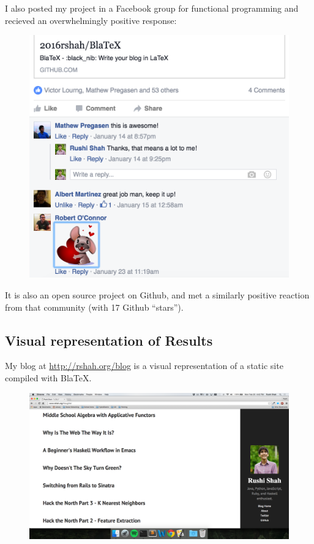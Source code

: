\documentclass[doc,apacite,12pt]{apa6}
\begin{document}
I also posted my project in a Facebook group for functional programming and recieved an overwhelmingly positive response: 
\begin{figure}[ht]
	\includegraphics[width=\textwidth]{facebook}
	\centering
\end{figure}

It is also an open source project on Github, and met a similarly positive reaction from that community (with 17 Github ``stars''). 

\subsection{Visual representation of Results}

My blog at \url{http://rshah.org/blog} is a visual representation of a static site compiled with BlaTeX.

\begin{figure}[h]
	\includegraphics[width=\textwidth]{BlaTeX_screenshot}
	\centering
\end{figure}
\end{document}
